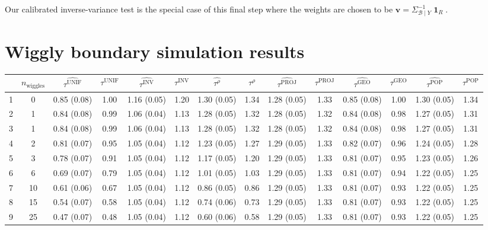 \documentclass[letter]{article}
\DeclareMathOperator{\ones}{\mathbf{1}}
\newcommand{\vvec}{\mathbold{v}}
\newcommand{\boundary}{\mathcal{B}}
\newcommand{\unifavg}{\tau^{\mathrm{UNIF}}}
\newcommand{\invvar}{\tau^{\mathrm{INV}}}
\newcommand{\taurho}{\tau^{\rho}}
\newcommand{\tauproj}{\tau^{\mathrm{PROJ}}}
\newcommand{\taugeo}{\tau^{\mathrm{GEO}}}
\newcommand{\taupop}{\tau^{\mathrm{POP}}}
\newcommand{\numsent}{R}
\begin{document}
Our calibrated inverse-variance test is the special case of this final step where the weights are chosen to be \(\vvec = \Sigma^{-1}_{\boundary \mid Y} \ones_{\numsent}\).
    


    	\section{Wiggly boundary simulation results}\label{wiggly-boundary-simulation-results}
    

\begin{landscape}

\begin{table}
\begin{tabular}{r|ccccccccccccc}
	& $n_{\mathrm{wiggles}}$ & $\widehat{\unifavg}$ & $\unifavg$ & $\widehat{\invvar}$ & $\invvar$ & $\widehat{\taurho}$ & $\taurho$ & $\widehat{\tauproj}$ & $\tauproj$ & $\widehat{\taugeo}$ & $\taugeo$ & $\widehat{\taupop}$ & $\taupop$\\
		\hline
		1 & 0 & 0.85 (0.08) & 1.00 & 1.16 (0.05) & 1.20 & 1.30 (0.05) & 1.34 & 1.28 (0.05) & 1.33 & 0.85 (0.08) & 1.00 & 1.30 (0.05) & 1.34 \\
		2 & 1 & 0.84 (0.08) & 0.99 & 1.06 (0.04) & 1.13 & 1.28 (0.05) & 1.32 & 1.28 (0.05) & 1.32 & 0.84 (0.08) & 0.98 & 1.27 (0.05) & 1.31 \\
		3 & 1 & 0.84 (0.08) & 0.99 & 1.06 (0.04) & 1.13 & 1.28 (0.05) & 1.32 & 1.28 (0.05) & 1.32 & 0.84 (0.08) & 0.98 & 1.27 (0.05) & 1.31 \\
		4 & 2 & 0.81 (0.07) & 0.95 & 1.05 (0.04) & 1.12 & 1.23 (0.05) & 1.27 & 1.29 (0.05) & 1.33 & 0.82 (0.07) & 0.96 & 1.24 (0.05) & 1.28 \\
		5 & 3 & 0.78 (0.07) & 0.91 & 1.05 (0.04) & 1.12 & 1.17 (0.05) & 1.20 & 1.29 (0.05) & 1.33 & 0.81 (0.07) & 0.95 & 1.23 (0.05) & 1.26 \\
		6 & 6 & 0.69 (0.07) & 0.79 & 1.05 (0.04) & 1.12 & 1.01 (0.05) & 1.03 & 1.29 (0.05) & 1.33 & 0.81 (0.07) & 0.94 & 1.22 (0.05) & 1.25 \\
		7 & 10 & 0.61 (0.06) & 0.67 & 1.05 (0.04) & 1.12 & 0.86 (0.05) & 0.86 & 1.29 (0.05) & 1.33 & 0.81 (0.07) & 0.93 & 1.22 (0.05) & 1.25 \\
		8 & 15 & 0.54 (0.07) & 0.58 & 1.05 (0.04) & 1.12 & 0.74 (0.06) & 0.73 & 1.29 (0.05) & 1.33 & 0.81 (0.07) & 0.93 & 1.22 (0.05) & 1.25 \\
		9 & 25 & 0.47 (0.07) & 0.48 & 1.05 (0.04) & 1.12 & 0.60 (0.06) & 0.58 & 1.29 (0.05) & 1.33 & 0.81 (0.07) & 0.93 & 1.22 (0.05) & 1.25 \\

\end{tabular}
\end{table}
\end{landscape}
\end{document}
